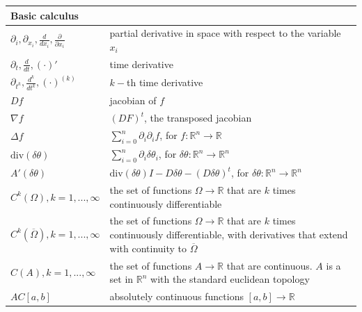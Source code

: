 \documentclass[english,a4paper,10pt,oneside]{scrbook}	%
\theoremstyle{break}
\theoremstyle{remark}
\newcommand{\mR}{\mathbb{R}}
\newcommand{\te}{\theta}
\newcommand{\dive}{\text{div}}
\begin{document}
\begin{longtable}{ll}
\multicolumn{2}{l}{\textbf{Basic calculus}}    \\ 
\hline
$\partial_i, \partial_{x_i}, \frac{d}{dx_i}, \frac{\partial}{\partial x_i}$ & partial derivative in space with respect to the variable $x_i$                      \\ 
\hline
$\partial_t, \frac{d}{dt}, (\cdot)'$ & time derivative                       \\ 
\hline
$\partial_{t^k}, \frac{d^k}{dt^{k}}, (\cdot)^{(k)}$ & $k-$th time derivative                       \\ 
\hline
$Df$ & jacobian of $f$                       \\
\hline
$\nabla f$ & $(DF)^t$, the transposed jacobian                       \\  
\hline
$\Delta f$ & $\sum_{i=0}^n \partial_i\partial_i f$, for $f:\mR^n \rightarrow\mR$ \\ 
\hline
$\dive(\delta \te)$ & $\sum_{i=0}^n \partial_i\delta \te_i$, for $\delta \te:\mR^n \rightarrow\mR^n$ \\ 
\hline
$A'(\delta \te)$ & $\dive(\delta \te)I -D\delta \te -(D\delta \te)^t$, for $\delta \te:\mR^n \rightarrow\mR^n$ \\ 
\hline
$C^k(\Omega), k=1,...,\infty$ & the set of functions $\Omega \rightarrow \mR$ that are $k$ times continuously differentiable                       \\ 
\hline
$C^k(\overline{\Omega}), k=1,...,\infty$ & \makecell[l]{the set of functions $\Omega \rightarrow \mR$ that are $k$ times continuously differentiable,\\with derivatives that extend with continuity to $\overline{\Omega}$ } \\ 
\hline
$C(A), k=1,...,\infty$ & \makecell[l]{the set of functions $A \rightarrow \mR$ that are continuous. $A$ is a set in $\mR^n$ with\\the standard euclidean topology} \\ 
\hline
$AC[a,b]$ & absolutely continuous functions $[a,b]\rightarrow \mR$ \\
\hline


\end{longtable}
\end{document}
